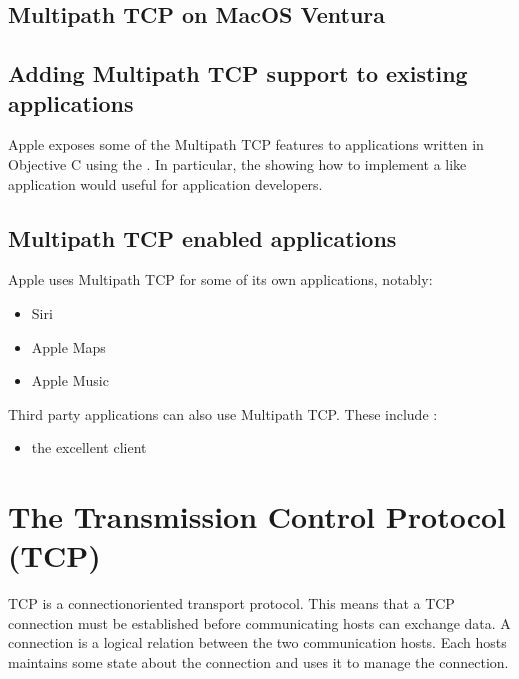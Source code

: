 \documentclass[letterpaper,10pt,english]{sphinxmanual}
\begin{document}
\section{Multipath TCP on MacOS Ventura}
\label{\detokenize{mptcp-apple:multipath-tcp-on-macos-ventura}}

\section{Adding Multipath TCP support to existing applications}
\label{\detokenize{mptcp-apple:adding-multipath-tcp-support-to-existing-applications}}
\sphinxAtStartPar
Apple exposes some of the Multipath TCP features to applications written in Objective C using the . In particular, the  showing how to implement a \sphinxhyphen{}like application would useful for application developers.


\section{Multipath TCP enabled applications}
\label{\detokenize{mptcp-apple:multipath-tcp-enabled-applications}}
\sphinxAtStartPar
Apple uses Multipath TCP for some of its own applications, notably:
\begin{itemize}
\item {} 
\sphinxAtStartPar
Siri

\item {} 
\sphinxAtStartPar
Apple Maps

\item {} 
\sphinxAtStartPar
Apple Music

\end{itemize}

\sphinxAtStartPar
Third party applications can also use Multipath TCP. These include :
\begin{itemize}
\item {} 
\sphinxAtStartPar
the excellent   client

\end{itemize}


\chapter{The Transmission Control Protocol (TCP)}
\label{\detokenize{tcp:the-transmission-control-protocol-tcp}}\label{\detokenize{tcp:chapter-tcp}}\label{\detokenize{tcp::doc}}
\sphinxAtStartPar
TCP is a connection\sphinxhyphen{}oriented transport protocol. This means that a TCP connection must be established before communicating hosts can exchange data. A connection is a logical relation between the two communication hosts. Each hosts maintains some state about the connection and uses it to manage the connection.
\end{document}
